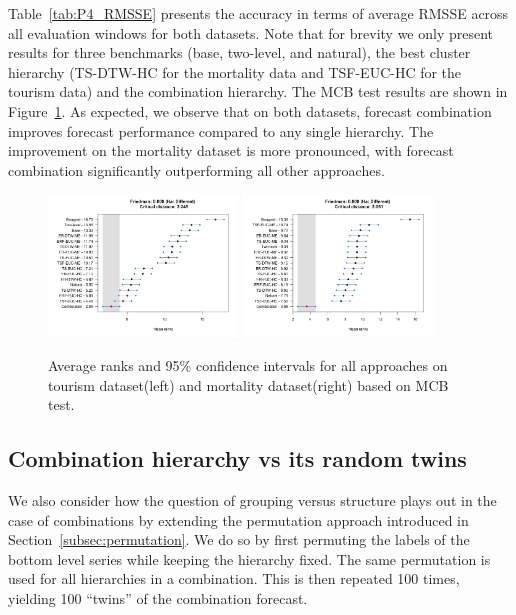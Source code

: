 \documentclass[a4paper,review,12pt,authoryear]{elsarticle}
\begin{document}
Table~\ref{tab:P4_RMSSE} presents the accuracy in terms of average RMSSE across all evaluation windows for both datasets. Note that for brevity we only present results for three benchmarks (base, two-level, and natural), the best cluster hierarchy (TS-DTW-HC for the mortality data and TSF-EUC-HC for the tourism data) and the combination hierarchy. The MCB test results are shown in Figure~\ref{fig:P4_bench_mcb}. 
As expected, we observe that on both datasets, forecast combination improves forecast performance compared to any single hierarchy. 
The improvement on the mortality dataset is more pronounced, with forecast combination significantly outperforming all other approaches.

\begin{figure}[!h]
    \centering
    \includegraphics[width=0.45\textwidth]{../figures/Figure12_tourism_mcb_combination.jpg}
    \includegraphics[width=0.45\textwidth]{../figures/Figure12_mortality_mcb_combination.jpg}
    \caption{\label{fig:P4_bench_mcb}Average ranks and 95\% confidence intervals for all approaches on tourism dataset(left) and mortality dataset(right) based on MCB test.}
\end{figure}



\subsection{Combination hierarchy vs its random twins}

We also consider how the question of grouping versus structure plays out in the case of combinations by extending the permutation approach introduced in Section~\ref{subsec:permutation}. We do so by first permuting the labels of the bottom level series while keeping the hierarchy fixed. The same permutation is used for all hierarchies in a combination. This is then repeated 100 times, yielding 100 ``twins'' of the combination forecast.
\end{document}

